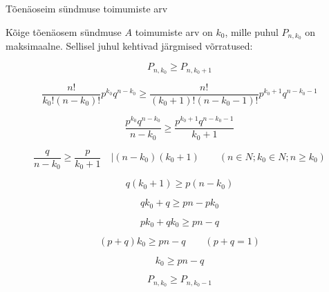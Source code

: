 \documentclass{report}
\begin{document}
\begin{large}
 Tõenäoseim sündmuse toimumiste arv
\end{large}

\begin{flushleft}
Kõige tõenäosem sündmuse $A$ toimumiste arv on
$k_0$, mille puhul $P_{n,k_0}$ on maksimaalne. Sellisel juhul kehtivad järgmised võrratused:
\end{flushleft}

\noindent\makebox[\linewidth]{\rule{\paperwidth}{0.4pt}}

\begin{displaymath}
P_{n,k_0} \geq P_{n,k_0 + 1}
\end{displaymath}

\begin{displaymath}
\frac{n!}{k_0!(n-k_0)!}p^{k_0}q^{n-k_0} \geq \frac{n!}{(k_0 + 1)!(n - k_0 - 1)!}p^{k_0+1}q^{n-k_0-1}
\end{displaymath}

\begin{displaymath}
\frac{p^{k_0}q^{n-k_0}}{n-k_0} \geq \frac{p^{k_0+1}q^{n-k_0-1}}{k_0 + 1}
\end{displaymath}

\begin{displaymath}
\frac{q}{n - k_0} \geq \frac{p}{k_0 + 1}
\quad | (n-k_0)(k_0+1) \qquad (n \in N; k_0 \in N; n \geq k_0)
\end{displaymath}

\begin{displaymath}
q(k_0 + 1) \geq p(n - k_0)
\end{displaymath}

\begin{displaymath}
qk_0 + q \geq pn - pk_0
\end{displaymath}

\begin{displaymath}
pk_0 + qk_0 \geq pn - q
\end{displaymath}

\begin{displaymath}
(p + q) k_0 \geq pn - q \qquad (p + q = 1)
\end{displaymath}

\begin{displaymath}
k_0 \geq pn - q
\end{displaymath}

\noindent\makebox[\linewidth]{\rule{\paperwidth}{0.4pt}}

\begin{displaymath}
P_{n,k_0} \geq P_{n,k_0 - 1}
\end{displaymath}
\end{document}
